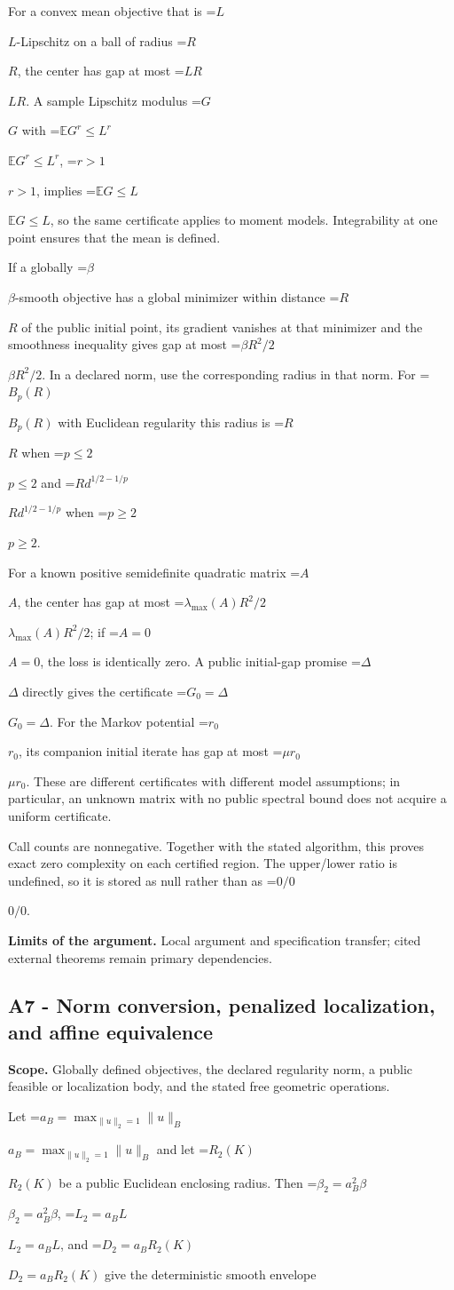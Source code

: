 \documentclass[10pt,a4paper]{article}
\newcommand{\AtlasMath}[1]{\par\begingroup\centering\setbox0=\hbox{$\displaystyle #1$}\ifdim\wd0>1.4\linewidth\typeout{ATLAS WIDE FORMULA: \the\wd0}\fi\ifdim\wd0>\linewidth\resizebox{\linewidth}{!}{\box0}\else\box0\fi\par\endgroup}
\newcommand{\AtlasInlineMath}[1]{\begingroup\setbox0=\hbox{$#1$}\ifdim\wd0>.4\linewidth\endgroup\AtlasMath{#1}\else\endgroup$#1$\fi}
\begin{document}
For a convex mean objective that is \AtlasInlineMath{L}-Lipschitz on a ball of radius \AtlasInlineMath{R}, the center has gap at most \AtlasInlineMath{LR}. A sample Lipschitz modulus \AtlasInlineMath{G} with \AtlasInlineMath{\mathbb E G^r\le L^r}, \AtlasInlineMath{r>1}, implies \AtlasInlineMath{\mathbb E G\le L}, so the same certificate applies to moment models. Integrability at one point ensures that the mean is defined.

If a globally \AtlasInlineMath{\beta}-smooth objective has a global minimizer within distance \AtlasInlineMath{R} of the public initial point, its gradient vanishes at that minimizer and the smoothness inequality gives gap at most \AtlasInlineMath{\beta R^2/2}. In a declared norm, use the corresponding radius in that norm. For \AtlasInlineMath{B_p(R)} with Euclidean regularity this radius is \AtlasInlineMath{R} when \AtlasInlineMath{p\le2} and \AtlasInlineMath{R d^{1/2-1/p}} when \AtlasInlineMath{p\ge2}.

For a known positive semidefinite quadratic matrix \AtlasInlineMath{A}, the center has gap at most \AtlasInlineMath{\lambda_{\max}(A)R^2/2}; if \AtlasInlineMath{A=0}, the loss is identically zero. A public initial-gap promise \AtlasInlineMath{\Delta} directly gives the certificate \AtlasInlineMath{G_0=\Delta}. For the Markov potential \AtlasInlineMath{r_0}, its companion initial iterate has gap at most \AtlasInlineMath{\mu r_0}. These are different certificates with different model assumptions; in particular, an unknown matrix with no public spectral bound does not acquire a uniform certificate.

Call counts are nonnegative. Together with the stated algorithm, this proves exact zero complexity on each certified region. The upper/lower ratio is undefined, so it is stored as null rather than as \AtlasInlineMath{0/0}.

\textbf{Limits of the argument.} Local argument and specification transfer; cited external theorems remain primary dependencies.

\subsection{A7 - Norm conversion, penalized localization, and affine equivalence}
\textbf{Scope.} Globally defined objectives, the declared regularity norm, a public feasible or localization body, and the stated free geometric operations.

Let \AtlasInlineMath{a_B=\max_{\|u\|_2=1}\|u\|_B} and let \AtlasInlineMath{R_2(K)} be a public Euclidean enclosing radius. Then \AtlasInlineMath{\beta_2=a_B^2\beta}, \AtlasInlineMath{L_2=a_BL}, and \AtlasInlineMath{D_2=a_BR_2(K)} give the deterministic smooth envelope
\end{document}
